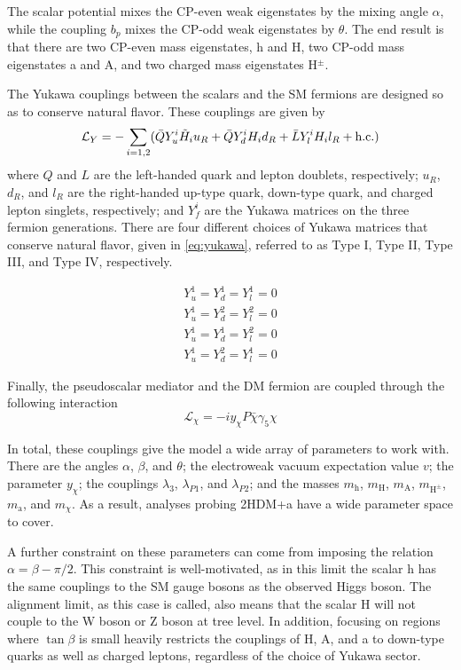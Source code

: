 The scalar potential mixes the CP-even weak eigenstates by the mixing angle $\alpha$, while the coupling $b_p$ mixes the CP-odd weak eigenstates by $\theta$. The end result is that there are two CP-even mass eigenstates, h and H, two CP-odd mass eigenstates a and A, and two charged mass eigenstates H$^{\pm}$.

The Yukawa couplings between the scalars and the SM fermions are designed so as to conserve natural flavor. These couplings are given by
\begin{equation}
    \mathcal{L}_Y = - \sum_{i=1,2}(\bar{Q}Y^i_u\Tilde{H}_iu_R+\bar{Q}Y^i_dH_id_R+\bar{L}Y^i_lH_il_R+\text{h.c.})
\end{equation}
where $Q$ and $L$ are the left-handed quark and lepton doublets, respectively; $u_R$, $d_R$, and $l_R$ are the right-handed up-type quark, down-type quark, and charged lepton singlets, respectively; and $Y^i_f$ are the Yukawa matrices on the three fermion generations. There are four different choices of Yukawa matrices that conserve natural flavor, given in \cref{eq:yukawa}, referred to as Type I, Type II, Type III, and Type IV, respectively.

\begin{align}
    Y^1_u = Y^1_d = Y^1_l = 0 \label{eq:yukawa} \\ 
    Y^1_u = Y^2_d = Y^2_l = 0 \nonumber \\
    Y^1_u = Y^1_d = Y^2_l = 0 \nonumber \\
    Y^1_u = Y^2_d = Y^1_l = 0 \nonumber
\end{align}

Finally, the pseudoscalar mediator and the DM fermion are coupled through the following interaction
\begin{equation}
    \mathcal{L}_\chi = -iy_\chi P\bar{\chi}\gamma_5\chi
\end{equation}

In total, these couplings give the model a wide array of parameters to work with. There are the angles $\alpha$, $\beta$, and $\theta$; the electroweak vacuum expectation value $v$; the parameter $y_\chi$; the couplings $\lambda_3$, $\lambda_{P1}$, and $\lambda_{P2}$; and the masses $m_\mathrm{h}$, $m_\mathrm{H}$, $m_\mathrm{A}$, $m_{\mathrm{H}^{\pm}}$, $m_\mathrm{a}$, and $m_\chi$. As a result, analyses probing 2HDM+a have a wide parameter space to cover.

A further constraint on these parameters can come from imposing the relation $\alpha = \beta - \pi/2$. This constraint is well-motivated, as in this limit the scalar h has the same couplings to the SM gauge bosons as the observed Higgs boson. The alignment limit, as this case is called, also means that the scalar H will not couple to the W boson or Z boson at tree level. In addition, focusing on regions where $\tan\beta$ is small heavily restricts the couplings of H, A, and a to down-type quarks as well as charged leptons, regardless of the choice of Yukawa sector.

